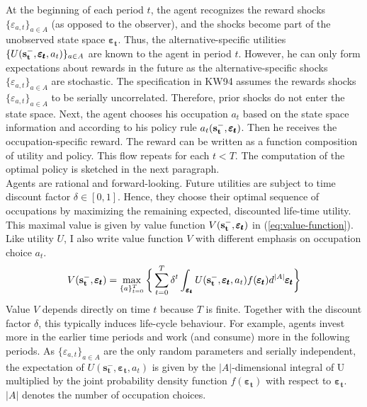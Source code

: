 \noindent
At the beginning of each period $t$, the agent recognizes the reward shocks $\{\varepsilon_{a,t}\}_{a \in A}$ (as opposed to the observer), and the shocks become part of the unobserved state space $\pmb{\varepsilon_t}$. Thus, the alternative-specific utilities $\{U(\bold{s_t^-}, \pmb{\varepsilon_t},a_t)\}_{a \in A}$ are known to the agent in period $t$. However, he can only form expectations about rewards in the future as the alternative-specific shocks $\{\varepsilon_{a,t}\}_{a \in A}$ are stochastic. The specification in KW94 assumes the rewards shocks $\{\varepsilon_{a,t}\}_{a \in A}$ to be serially uncorrelated. Therefore, prior shocks do not enter the state space. Next, the agent chooses his occupation $a_t$ based on the state space information and according to his policy rule $a_t(\bold{s_t^-}, \pmb{\varepsilon_t})$. Then he receives the occupation-specific reward. The reward can be written as a function composition of utility and policy. This flow repeats for each $t < T$. The computation of the optimal policy is sketched in the next paragraph.\\
\newline
Agents are rational and forward-looking. Future utilities are subject to time discount factor $\delta  \in [0,1]$. Hence, they choose their optimal sequence of occupations by maximizing the remaining expected, discounted life-time utility. This maximal value is given by value function $V(\bold{s_t^-}, \pmb{\varepsilon_t})$ in (\ref{eq:value-function}). Like utility $U$, I also write value function $V$ with different emphasis on occupation choice $a_t$.
\begin{align} \label{eq:value-function}
V(\bold{s_t^-}, \pmb{\varepsilon_t}) = \max_{\{a\}_{t=0}^T} \bigg\{ \sum_{t=0}^T \delta^t \int_{\pmb{\varepsilon_t}} U(\bold{s_{t}^{-}},\pmb{\varepsilon_{t}}, a_{t}) f(\pmb{\varepsilon_{t}})d^{|A|}\pmb{\varepsilon_{t}}\bigg\}
\end{align}
Value $V$ depends directly on time $t$ because $T$ is finite. Together with the discount factor $\delta$, this typically induces life-cycle behaviour. For example, agents invest more in the earlier time periods and work (and consume) more in the following periods. As $\{\varepsilon_{a,t}\}_{a \in A}$ are the only random parameters and serially independent, the expectation of $U(\bm{s_{t}^{-}},\pmb{\varepsilon_{t}}, a_{t})$ is given by the $|A|$-dimensional integral of U multiplied by the joint probability density function $f(\pmb{\varepsilon_{t}})$ with respect to $\pmb{\varepsilon_{t}}$. $|A|$ denotes the number of occupation choices.

